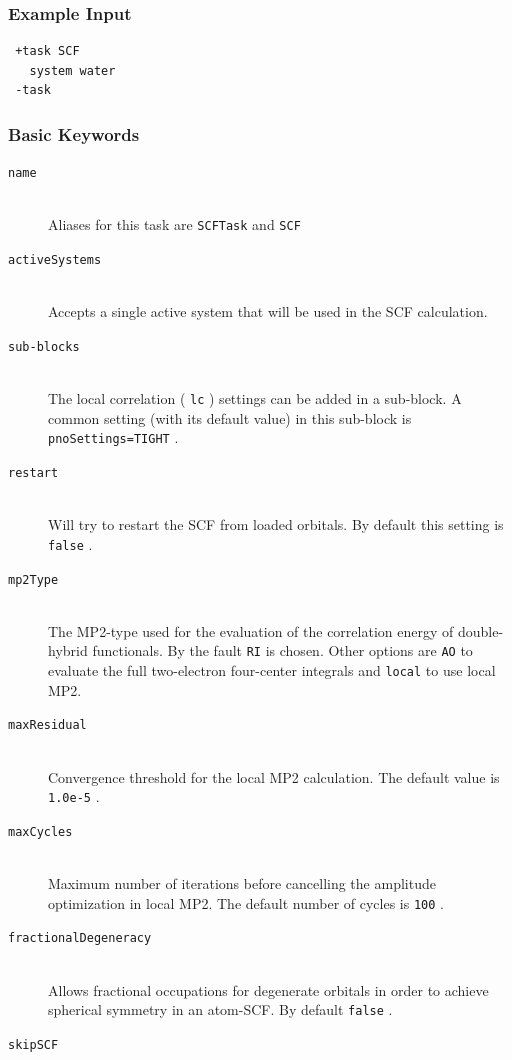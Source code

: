 \documentclass[bibliography=totocnumbered,a4paper,10pt,oneside]{scrbook}
\newcommand{\ttt}[1]{%
  \begingroup\setlength{\fboxsep}{1pt}%
  \colorbox{serenity-green!30}{\texttt{\hspace*{2pt}\vphantom{(g}#1\hspace*{2pt}}}%
  \endgroup
}
\begin{document}
\subsubsection{Example Input}
\begin{lstlisting}
 +task SCF
   system water
 -task
\end{lstlisting}
\subsubsection{Basic Keywords}
\begin{description}
	\item[\texttt{name}]\hfill \\
	Aliases for this task are \ttt{SCFTask} and \ttt{SCF}
	\item[\texttt{activeSystems}]\hfill \\
	Accepts a single active system that will be used in the SCF calculation.
	\item[\texttt{sub-blocks}]\hfill \\
	The local correlation (\ttt{lc}) settings can be added in a sub-block. A common setting (with its default value) in this sub-block is \ttt{pnoSettings=TIGHT}.	
	\item[\texttt{restart}]\hfill \\
	Will try to restart the SCF from loaded orbitals. By default this setting is \ttt{false}.
	\item[\texttt{mp2Type}]\hfill \\
	The MP2-type used for the evaluation of the correlation energy of double-hybrid functionals. By the fault \ttt{RI} is chosen. Other options are \ttt{AO} to evaluate the full two-electron four-center integrals and \ttt{local} to use local MP2.
	\item[\texttt{maxResidual}]\hfill \\
	Convergence threshold for the local MP2 calculation. The default value is \ttt{1.0e-5}.
	\item[\texttt{maxCycles}]\hfill \\
	Maximum number of iterations before cancelling the amplitude optimization in local MP2. The default number of cycles is \ttt{100}.
	\item[\texttt{fractionalDegeneracy}]\hfill \\
	Allows fractional occupations for degenerate orbitals in order to achieve spherical symmetry in an atom-SCF. By default \ttt{false}.
	\item[\texttt{skipSCF}]\hfill \\

\end{description}
\end{document}

